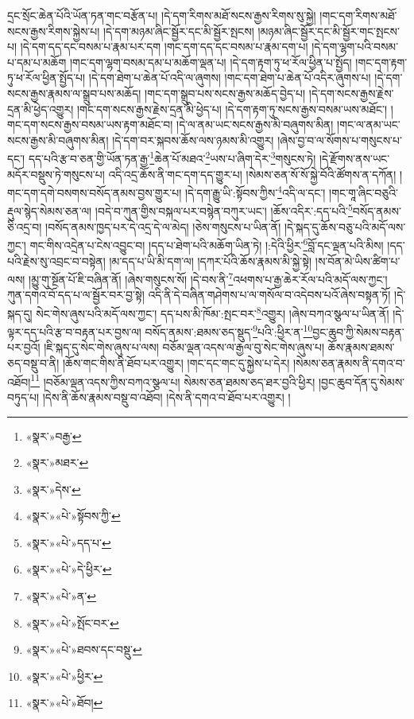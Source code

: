 དྲང་སྲོང་ཆེན་པོའི་ཡོན་ཏན་གང་བརྩོན་པ། །དེ་དག་རིགས་མཐོ་སངས་རྒྱས་རིགས་སུ་སྐྱེ། །གང་དག་རིགས་མཐོ་སངས་རྒྱས་རིགས་སྐྱེས་པ། །དེ་དག་མཉམ་ཞིང་སྦྱོར་དང་མི་སྦྱོར་སྤངས། །མཉམ་ཞིང་སྦྱོར་དང་མི་སྦྱོར་གང་སྤངས་པ། །དེ་དག་དད་དང་བསམ་པ་རྣམ་པར་དག །གང་དག་དད་དང་བསམ་པ་རྣམ་དག་པ། །དེ་དག་ལྷག་པའི་བསམ་པ་དམ་པ་མཆོག །གང་དག་ལྷག་བསམ་དམ་པ་མཆོག་ལྡན་པ། །དེ་དག་རྟག་ཏུ་ཕ་རོལ་ཕྱིན་པ་སྤྱོད། །གང་དག་རྟག་ཏུ་ཕ་རོལ་ཕྱིན་སྤྱོད་པ། །དེ་དག་ཐེག་པ་ཆེན་པོ་འདི་ལ་ཞུགས། །གང་དག་ཐེག་པ་ཆེན་པོ་འདིར་ཞུགས་པ། །དེ་དག་སངས་རྒྱས་རྣམས་ལ་སྒྲུབ་པས་མཆོད། །གང་དག་སྒྲུབ་པས་སངས་རྒྱས་མཆོད་བྱེད་པ། །དེ་དག་སངས་རྒྱས་རྗེས་དྲན་མི་ཕྱེད་འགྱུར། །གང་དག་སངས་རྒྱས་རྗེས་དྲན་མི་ཕྱེད་པ། །དེ་དག་རྟག་ཏུ་སངས་རྒྱས་བསམ་ཡས་མཐོང་། །གང་དག་སངས་རྒྱས་བསམ་ཡས་རྟག་མཐོང་བ། །དེ་ལ་ནམ་ཡང་སངས་རྒྱས་མི་བཞུགས་མིན། །གང་ལ་ནམ་ཡང་སངས་རྒྱས་མི་བཞུགས་མིན། །དེ་དག་བར་སྐབས་ཆོས་ལས་ཉམས་མི་འགྱུར། །ཞེས་བྱ་བ་ལ་སོགས་པ་གསུངས་པ་དང་། དད་པའི་རྩ་བ་ཅན་གྱི་ཡོན་ཏན་རྒྱ་\footnote{«སྣར་»བརྒྱ་}ཆེན་པོ་མཐའ་\footnote{«སྣར་»མཐར་}ཡས་པ་ཞིག་དེར་\footnote{«སྣར་»དེས་}གསུངས་ཏེ། །དེ་རྫོགས་ནས་ཡང་མདོར་བསྡུས་ཏེ་གསུངས་པ། འདི་འདྲ་ཆོས་ནི་གང་དག་དད་གྱུར་པ། །སེམས་ཅན་སོ་སོ་སྐྱེ་བོའི་ཚོགས་ན་དཀོན། །གང་དག་དགེ་བསགས་བསོད་ནམས་བྱས་གྱུར་པ། །དེ་དག་རྒྱུ་ཡི་:སྟོབས་ཀྱིས་\footnote{«སྣར་»«པེ་»སྟོབས་ཀྱི་}འདི་ལ་དང་། །གང་གཱ་ཞིང་བཅུའི་རྡུལ་སྙེད་སེམས་ཅན་ལ། །བདེ་བ་ཀུན་གྱིས་བསྐལ་པར་བསྙེན་བཀུར་ཡང་། །ཆོས་འདིར་:དད་པའི་\footnote{«སྣར་»«པེ་»དད་པ་}བསོད་ནམས་ཅི་འདྲ་བ། །བསོད་ནམས་ཁྱད་པར་དེ་འདྲ་དེ་ལ་མེད། །ཅེས་གསུངས་པ་ཡིན་ནོ། །དེ་སྐད་དུ་ཆོས་བཅུ་པའི་མདོ་ལས་ཀྱང་། གང་གིས་འདྲེན་པ་ངེས་འབྱུང་བ། །དད་པ་ཐེག་པའི་མཆོག་ཡིན་ཏེ། །:དེའི་ཕྱིར་\footnote{«སྣར་»«པེ་»དེ་ཕྱིར་}བློ་དང་ལྡན་པའི་མིས། །དད་པའི་རྗེས་སུ་འབྲང་བ་བསྟེན། །མ་དད་པ་ཡི་མི་དག་ལ། །དཀར་པོའི་ཆོས་རྣམས་མི་སྐྱེ་སྟེ། །ས་བོན་མེ་ཡིས་ཚིག་པ་ལས། །མྱུ་གུ་སྔོན་པོ་ཇི་བཞིན་ནོ། །ཞེས་གསུངས་སོ། །དེ་བས་ནི་\footnote{«སྣར་»«པེ་»ན་}འཕགས་པ་རྒྱ་ཆེར་རོལ་པའི་མདོ་ལས་ཀྱང་། ཀུན་དགའ་བོ་དད་པ་ལ་སྦྱོར་བར་བྱ་སྟེ། འདི་ནི་དེ་བཞིན་གཤེགས་པ་ལ་གསོལ་བ་འདེབས་པའོ་ཞེས་བསྟན་ཏོ། །དེ་སྐད་དུ། སེང་གེས་ཞུས་པའི་མདོ་ལས་ཀྱང་། དད་པས་མི་ཁོམ་:སྤང་བར་\footnote{«སྣར་»«པེ་»སྤོང་བར་}འགྱུར། །ཞེས་བཀའ་སྩལ་པ་ཡིན་ནོ། །དེ་ལྟར་དད་པའི་རྩ་བ་བརྟན་པར་བྱས་ལ། བསོད་ནམས་:ཐམས་ཅད་སྡུད་\footnote{«སྣར་»«པེ་»ཐབས་དང་བསྡུ་}པའི་:ཕྱིར་ན་\footnote{«སྣར་»«པེ་»ཕྱིར་}བྱང་ཆུབ་ཀྱི་སེམས་བརྟན་པར་བྱའོ། །ཇི་སྐད་དུ་སེང་གེས་ཞུས་པ་ལས། བཅོམ་ལྡན་འདས་ལ་རྒྱལ་བུ་སེང་གེས་ཞུས་པ། ཆོས་རྣམས་ཐམས་ཅད་བསྡུ་བ་ནི། །ཆོས་གང་གིས་ནི་ཐོབ་པར་འགྱུར། །གང་དང་གང་དུ་སྐྱེས་པ་དེར། །སེམས་ཅན་རྣམས་ནི་དགའ་བ་འཐོབ།\footnote{«སྣར་»«པེ་»ཐོབ།} །བཅོམ་ལྡན་འདས་ཀྱིས་བཀའ་སྩལ་པ། སེམས་ཅན་ཐམས་ཅད་ཐར་བྱའི་ཕྱིར། །བྱང་ཆུབ་དོན་དུ་སེམས་བཏུད་པ། །དེས་ནི་ཆོས་རྣམས་བསྡུ་བ་འཐོབ། །དེས་ནི་དགའ་བ་ཐོབ་པར་འགྱུར། །
